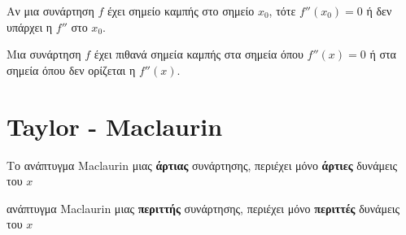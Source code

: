 \begin{prop}
  Αν μια συνάρτηση $f$ έχει σημείο καμπής στο σημείο $ x_{0} $, τότε $ f''(x_{0})=0 $ 
  ή δεν υπάρχει η $f''$ στο $ x_{0} $.
\end{prop}

\begin{rem}
  Μια συνάρτηση $f$ έχει πιθανά σημεία καμπής στα σημεία όπου $ f''(x)=0 $ ή στα 
  σημεία όπου δεν ορίζεται η $ f''(x) $.
\end{rem}

\section*{Taylor - Maclaurin}

\begin{prop}
\item {}
  \begin{myitemize}
    \item Το ανάπτυγμα Maclaurin μιας \textbf{άρτιας} συνάρτησης, περιέχει μόνο
      \textbf{άρτιες} δυνάμεις του $x$ 
    \item ανάπτυγμα Maclaurin μιας \textbf{περιττής} συνάρτησης, περιέχει μόνο
      \textbf{περιττές} δυνάμεις του $x$ 
  \end{myitemize}
\end{prop}



